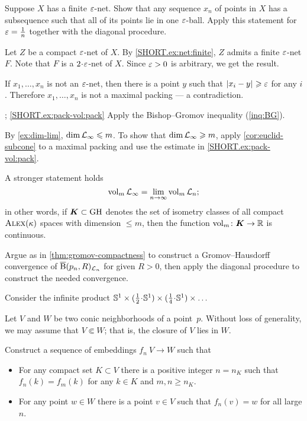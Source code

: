 Suppose $X$ has a finite $\varepsilon$-net.
Show that any sequence $x_n$ of points in $X$ has a subsequence such that all of its points lie in one $\varepsilon$-ball.
Apply this statement for $\varepsilon=\tfrac1n$ together with the diagonal procedure.

Let $Z$ be a compact $\varepsilon$-net of $X$.
By \ref{SHORT.ex:net:finite}, $Z$ admits a finite $\varepsilon$-net $F$.
Note that $F$ is a $2\cdot\eps$-net of $X$.
Since $\varepsilon>0$ is arbitrary, we get the result.


 If $x_1,\dots,x_n$ is not an $\varepsilon$-net, then there is a point $y$ such that $|{x_i}-{y}|_{}^{{}}\geqslant\varepsilon$ for any $i$.
Therefore $x_1,\dots,x_n$ is not a maximal packing --- a contradiction.

\parbf{\ref{ex:pack-vol}}; \ref{SHORT.ex:pack-vol:pack}
Apply the Bishop--Gromov inequality (\ref{inq:BG}).

\parit{\ref{SHORT.ex:pack-vol:dim}}
By \ref{ex:dim-lim}, $\operatorname{\rm dim}\nolimits\mathcal{L}_\infty\leqslant m$.
To show that $\operatorname{\rm dim}\nolimits\mathcal{L}_\infty\geqslant m$,
apply \ref{cor:euclid-subcone} to a maximal packing and use the estimate in \ref{SHORT.ex:pack-vol:pack}.

A stronger statement holds 
\[\operatorname{\rm vol}\nolimits_m\mathcal{L}_\infty=\lim_{n\to\infty} \operatorname{\rm vol}\nolimits_m\mathcal{L}_n;\]
in other words, if $\bm{K}\subset \operatorname{\rm GH}\nolimits$ denotes the set of isometry classes of all compact $\textsc{Alex}(\kappa)$ spaces with dimension $\le m$, then the function
$\operatorname{\rm vol}\nolimits_m\colon\bm{K}\to \mathbb{R}$ is continuous.


Argue as in \ref{thm:gromov-compactness} to construct a Gromov--Hausdorff convergence of $\overline{\mathrm{B}}{}(p_n,R)_{\mathcal{L}_n}$ for given $R>0$, then apply the diagonal procedure to construct the needed convergence.

Consider the infinite product $\SSS^1\times ({\tfrac 12}\cdot \SSS^1)\times ({\tfrac 14}\cdot \SSS^1)\times\dots$

Let $V$ and $W$ be two conic neighborhoods of a point~$p$.
Without loss of generality, we may assume that $V\Subset W$;
that is, the closure of $V$ lies in $W$.

Construct a sequence of embeddings $f_n\:V\to W$
such that 
\begin{itemize}
\item 
For any compact set $K\subset V$ 
there is a positive integer $n=n_K$ such that 
$f_n(k)=f_m(k)$ for any $k\in K$ and $m, n \ge n_K$.
\item For any point $w\in W$ there is a point $v\in V$ such that $f_n(v)=w$ for all large $n$.
\end{itemize}

